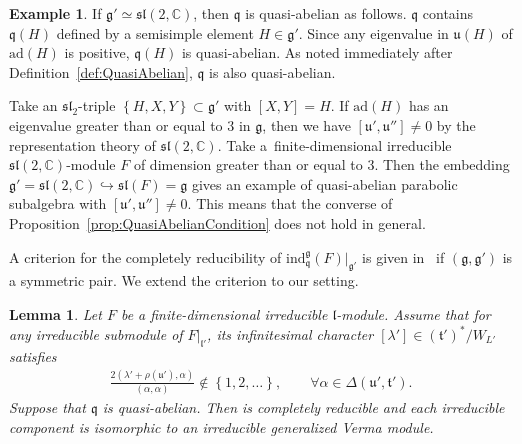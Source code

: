 \documentclass[10pt,a4paper]{amsart}
\numberwithin{equation}{section}
\newtheorem{Lemma}[Theorem]{Lemma}
\theoremstyle{definition}
\newtheorem{Example}[Theorem]{Example}
\newcommand{\set}[1]{\left\{#1 \right\}}
\newcommand{\BasicRing}[1]{\mathbb{#1}}
\newcommand{\CC}{\BasicRing{C}}
\newcommand{\ad}{\mathrm{ad}}
\newcommand{\lieC}[1]{\mathfrak{#1}}
\newcommand{\lie}[1]{\mathfrak{#1}}
\newcommand{\ind}[2]{\mathrm{ind}^{\lieC{#1}}_{\lieC{#2}}}
\begin{document}
\begin{Example}
	If $\lie{g'} \simeq \lie{sl}(2,\CC)$, then $\lie{q}$ is quasi-abelian as follows.
	$\lie{q}$ contains $\lie{q}(H)$ defined by a semisimple element $H\in \lie{g'}$.
	Since any eigenvalue in $\lie{u}(H)$ of $\ad(H)$ is positive, $\lie{q}(H)$ is quasi-abelian.
	As noted immediately after Definition~\ref{def:QuasiAbelian}, $\lie{q}$ is also quasi-abelian.

	Take an $\lie{sl}_2$-triple $\set{H, X, Y}\subset \lie{g'}$ with $[X, Y] = H$.
	If $\ad(H)$ has an eigenvalue greater than or equal to $3$ in $\lie{g}$, then we have $[\lie{u'}, \lie{u}''] \neq 0$
	by the representation theory of $\lie{sl}(2,\CC)$.
	Take a~finite-dimensional irreducible $\lie{sl}(2,\CC)$-module $F$ of dimension greater than or equal to $3$.
	Then the embedding $\lie{g'} = \lie{sl}(2,\CC) \hookrightarrow \lie{sl}(F) = \lie{g}$ gives an example
	of quasi-abelian parabolic subalgebra with $[\lie{u'}, \lie{u''}] \neq 0$.
	This means that the converse of Proposition~\ref{prop:QuasiAbelianCondition} does not hold in general.
\end{Example}


A criterion for the completely reducibility of $\ind{g}{q}(F)|_{\lie{g'}}$ is given in~\cite[Lemma~3.1]{EnPaWaWo85} if $(\lie{g}, \lie{g'})$ is a symmetric pair.
We extend the criterion to our setting.

\begin{Lemma}\label{lem:QuasiAbelianCompletelyReducible}
	Let $F$ be a finite-dimensional irreducible $\lie{l}$-module.
	Assume that for any irreducible submodule of $F|_{\lie{l}'}$, its infinitesimal character $[\lambda'] \in (\lie{t'})^*/W_{L'}$ satisfies
	\begin{align*}
		\frac{2(\lambda'+\rho(\lie{u}'), \alpha)}{(\alpha, \alpha)} \not \in \set{1, 2, \ldots}, \qquad \forall \alpha \in \Delta(\lie{u'}, \lie{t'}).
	\end{align*}
	Suppose that $\lie{q}$ is quasi-abelian.
	Then \smash{$\ind{g}{q}(F)|_{\lie{g}'}$} is completely reducible and each irreducible component is isomorphic to an irreducible generalized Verma module.
\end{Lemma}
\end{document}
